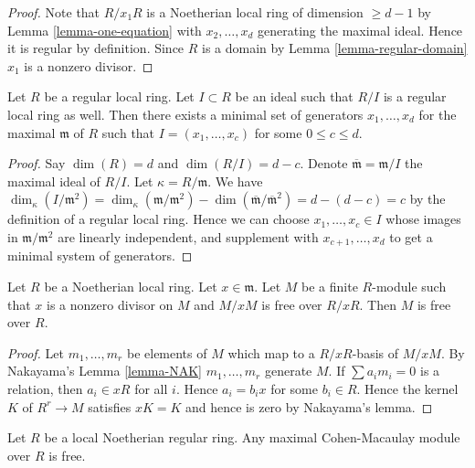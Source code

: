 \begin{proof}
Note that $R/x_1R$ is a Noetherian local ring of dimension $\geq d - 1$
by Lemma \ref{lemma-one-equation} with $x_2, \ldots, x_d$
generating the maximal ideal. Hence it is regular by definition.
Since $R$ is a domain by Lemma \ref{lemma-regular-domain}
$x_1$ is a nonzero divisor.
\end{proof}

\begin{lemma}
\label{lemma-regular-quotient-regular}
Let $R$ be a regular local ring. Let $I \subset R$ be an ideal
such that $R/I$ is a regular local ring as well. Then
there exists a minimal set of generators $x_1, \ldots, x_d$
for the maximal $\mathfrak m$ of $R$ such that
$I = (x_1, \ldots, x_c)$ for some $0 \leq c \leq d$.
\end{lemma}

\begin{proof}
Say $\dim(R) = d$ and $\dim(R/I) = d - c$.
Denote $\overline{\mathfrak m} = \mathfrak m/I$ the
maximal ideal of $R/I$. Let $\kappa = R/\mathfrak m$. We have
$\dim_\kappa(I/\mathfrak m^2) = \dim_\kappa(\mathfrak m/\mathfrak m^2)
- \dim(\overline{\mathfrak m}/\overline{\mathfrak m}^2) = d - (d -c) = c$
by the definition of a regular local ring. Hence we can choose
$x_1, \ldots, x_c \in I$ whose images in $\mathfrak m/\mathfrak m^2$
are linearly independent, and supplement with
$x_{c + 1}, \ldots, x_d$ to get a minimal system of generators.
\end{proof}

\begin{lemma}
\label{lemma-free-mod-x}
Let $R$ be a Noetherian local ring.
Let $x \in \mathfrak m$.
Let $M$ be a finite $R$-module such that
$x$ is a nonzero divisor on $M$ and
$M/xM$ is free over $R/xR$.
Then $M$ is free over $R$.
\end{lemma}

\begin{proof}
Let $m_1, \ldots, m_r$ be elements of $M$ which map to
a $R/xR$-basis of $M/xM$. By Nakayama's Lemma \ref{lemma-NAK}
$m_1, \ldots, m_r$ generate $M$. If $\sum a_i m_i = 0$
is a relation, then $a_i \in xR$ for all $i$. Hence
$a_i = b_i x$ for some $b_i \in R$. Hence
the kernel $K$ of $R^r \to M$ satisfies $xK = K$
and hence is zero by Nakayama's lemma.
\end{proof}

\begin{lemma}
\label{lemma-regular-mcm-free}
Let $R$ be a local Noetherian regular ring.
Any maximal Cohen-Macaulay module over $R$ is
free.
\end{lemma}


